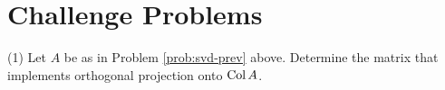 \section{Challenge Problems}

\begin{tasks}[resume, style=enumerate](1)
\task
  Let $A$ be as in Problem \ref{prob:svd-prev} above.  Determine the matrix that
  implements orthogonal projection onto $\operatorname{\mathrm{Col}} A$.
\end{tasks}
